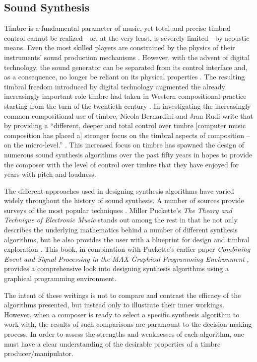 \documentclass[a4paper,12pt]{report} 	%
\numberwithin{figure}{chapter}
\numberwithin{table}{chapter}
\numberwithin{equation}{chapter}
\begin{document}
\begin{flushleft}
\section{Sound Synthesis}

Timbre is a fundamental parameter of music, yet total and precise timbral control cannot be realized---or, at the very least, is severely limited---by acoustic means. Even the most skilled players are constrained by the physics of their instruments' sound production mechanisms \cite[p. 11]{Wessel:2002uk}. However, with the advent of digital technology, the sound generator can be separated from its control interface and, as a consequence, no longer be reliant on its physical properties \cite[p. 1]{Malloch:2006jb}. The resulting timbral freedom introduced by digital technology augmented the already increasingly important role timbre had taken in Western compositional practice starting from the turn of the twentieth century \cite[p. 1]{Klingbeil:2009lo}. In investigating the increasingly common compositional use of timbre, Nicola Bernardini and Jran Rudi write that by providing a ``different, deeper and total control over timbre [computer music composition has placed a] stronger focus on the timbral aspects of composition -- on the micro-level.'' \cite[p. 3]{Bernardini:2001kc}. This increased focus on timbre has spawned the design of numerous sound synthesis algorithms over the past fifty years in hopes to provide the composer with the level of control over timbre that they have enjoyed for years with pitch and loudness.

The different approaches used in designing synthesis algorithms have varied widely throughout the history of sound synthesis. A number of sources provide surveys of the most popular techniques \cite{Roads:NotRead, Miranda:NotRead, Cook:NotRead}. Miller Puckette's \emph{The Theory and Technique of Electronic Music} stands out among the rest in that he not only describes the underlying mathematics behind a number of different synthesis algorithms, but he also provides the user with a blueprint for design and timbral exploration \cite{Puckette:2007ai}. This book, in combination with Puckette's earlier paper \emph{Combining Event and Signal Processing in the MAX Graphical Programming Environment} \cite{Puckette:NoRead2}, provides a comprehensive look into designing synthesis algorithms using a graphical programming environment. 

The intent of these writings is not to compare and contrast the efficacy of the algorithms presented, but instead only to illustrate their inner workings. However, when a composer is ready to select a specific synthesis algorithm to work with, the results of such comparisons are paramount to the decision-making process. In order to assess the strengths and weaknesses of each algorithm, one must have a clear understanding of the desirable properties of a timbre producer/manipulator.


\end{flushleft}
\end{document}
